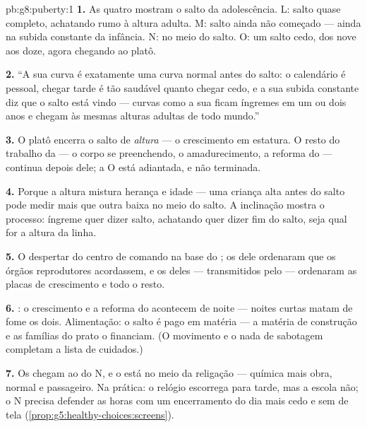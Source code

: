 \begin{solution}{pb:g8:puberty:1}
\textbf{1.} As quatro mostram o salto da adolescência. L: salto quase
completo, achatando rumo à altura adulta. M: salto ainda não
começado --- ainda na subida constante da infância. N: no meio do
salto. O: um salto cedo, dos nove aos doze, agora chegando ao platô.

\textbf{2.} ``A sua curva é exatamente uma curva normal antes do
salto: o calendário é pessoal, chegar tarde é tão saudável quanto
chegar cedo, e a sua subida constante diz que o salto está vindo ---
curvas como a sua ficam íngremes em um ou dois anos e chegam às mesmas
alturas adultas de todo mundo.''

\textbf{3.} O platô encerra o salto de \emph{altura} --- o crescimento
em estatura. O resto do trabalho da  --- o corpo se
preenchendo, o amadurecimento, a reforma do  --- continua depois
dele; a O está adiantada, e não terminada.

\textbf{4.} Porque a altura mistura herança e idade --- uma criança
alta antes do salto pode medir mais que outra baixa no meio do salto.
A inclinação mostra o processo: íngreme quer dizer salto, achatando
quer dizer fim do salto, seja qual for a altura da linha.

\textbf{5.} O despertar do centro de comando na base do ; os
 dele ordenaram que os órgãos reprodutores acordassem, e os
 deles --- transmitidos pelo  --- ordenaram as placas de
crescimento e todo o resto.

\textbf{6.} : o crescimento e a reforma do  acontecem de
noite --- noites curtas matam de fome os dois. Alimentação: o salto é
pago em matéria --- a matéria de construção e as famílias do prato o
financiam. (O movimento e o nada de sabotagem completam a lista de
cuidados.)

\textbf{7.} Os  chegam ao  do N, e o  está no
meio da religação --- química mais obra, normal e passageiro. Na
prática: o relógio escorrega para tarde, mas a escola não; o N precisa
defender as horas com um encerramento do dia mais cedo e sem  de
tela (\cref{prop:g5:healthy-choices:screens}).


\end{solution}
